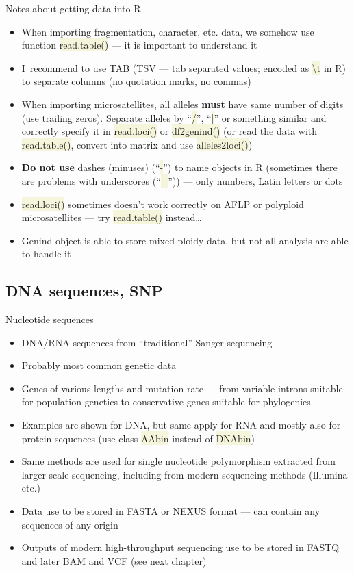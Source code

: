 \documentclass[compress, xelatex, 11pt, xcolor=svgnames, aspectratio=169, url={hyphens, lowtilde}]{beamer}
\renewcommand{\texttt}[1]{\colorbox{Beige}{{\ttfamily #1}}}
\begin{document}
\begin{frame}{Notes about getting data into R}
	\begin{itemize}
		\item When importing fragmentation, character, etc. data, we somehow use function \texttt{read.table()} --- it is important to understand it
		\item I~recommend to use TAB (TSV --- tab separated values; encoded as \texttt{\textbackslash t} in R) to separate columns (no quotation marks, no commas)
		\item When importing microsatellites, all alleles \textbf{must} have same number of digits (use trailing zeros). Separate alleles by \enquote{\texttt{/}}, \enquote{\texttt{|}} or something similar and correctly specify it in \texttt{read.loci()} or \texttt{df2genind()} (or read the data with \texttt{read.table()}, convert into matrix and use \texttt{alleles2loci()})
		\item \textbf{Do not use} dashes (minuses) (\enquote{\texttt{-}}) to name objects in R (sometimes there are problems with underscores (\enquote{\texttt{\_}})) --- only numbers, Latin letters or dots
		\item \texttt{read.loci()} sometimes doesn't work correctly on AFLP or polyploid microsatellites --- try \texttt{read.table()} instead\ldots
		\item Genind object is able to store mixed ploidy data, but not all analysis are able to handle it
	\end{itemize}
\end{frame}

\subsection{DNA sequences, SNP}

\begin{frame}{Nucleotide sequences}
	\begin{itemize}
		\item DNA/RNA sequences from \enquote{traditional} Sanger sequencing
		\item Probably most common genetic data
		\item Genes of various lengths and mutation rate --- from variable introns suitable for population genetics to conservative genes suitable for phylogenies
		\item Examples are shown for DNA, but same apply for RNA and mostly also for protein sequences (use class \texttt{AAbin} instead of \texttt{DNAbin})
		\item Same methods are used for single nucleotide polymorphism extracted from larger-scale sequencing, including from modern sequencing methods (Illumina etc.)
		\item Data use to be stored in FASTA  or NEXUS format --- can contain any sequences of any origin
		\item Outputs of modern high-throughput sequencing use to be stored in FASTQ and later BAM and VCF (see next chapter)
	\end{itemize}
\end{frame}
\end{document}
